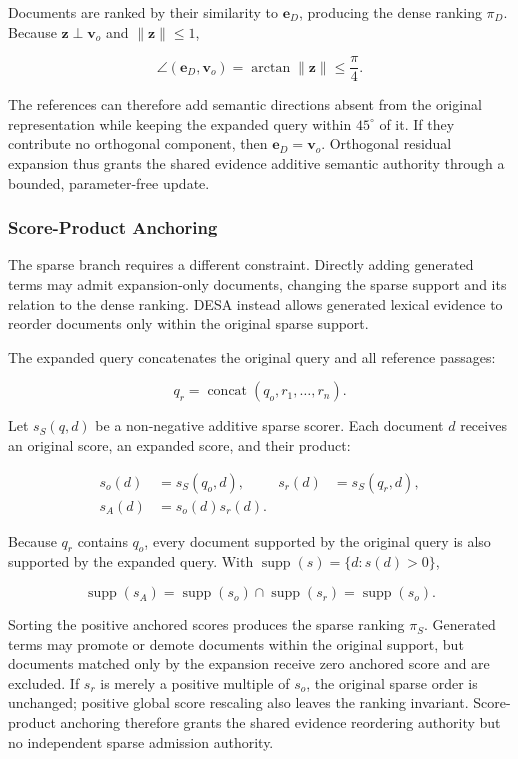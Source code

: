 Documents are ranked by their similarity to \(\mathbf e_D\), producing the dense ranking \(\pi_D\). Because \(\mathbf z\perp\mathbf v_o\) and \(\|\mathbf z\|\leq1\),

\[\angle(\mathbf e_D,\mathbf v_o)
=\arctan\|\mathbf z\|
\leq\frac{\pi}{4}.\]

The references can therefore add semantic directions absent from the original representation while keeping the expanded query within \(45^\circ\) of it. If they contribute no orthogonal component, then \(\mathbf e_D=\mathbf v_o\). Orthogonal residual expansion thus grants the shared evidence additive semantic authority through a bounded, parameter-free update.

\subsubsection{Score-Product Anchoring}

\label{score-product-anchoring}

The sparse branch requires a different constraint. Directly adding generated terms may admit expansion-only documents, changing the sparse support and its relation to the dense ranking. DESA instead allows generated lexical evidence to reorder documents only within the original sparse support.

The expanded query concatenates the original query and all reference passages:

\[q_r=\operatorname{concat}(q_o,r_1,\ldots,r_n).\]

Let \(s_S(q,d)\) be a non-negative additive sparse scorer. Each document \(d\) receives an original score, an expanded score, and their product:

\[\begin{aligned}
s_o(d)&=s_S(q_o,d), &
s_r(d)&=s_S(q_r,d),\\
s_A(d)&=s_o(d)s_r(d).&&
\end{aligned}\]

Because \(q_r\) contains \(q_o\), every document supported by the original query is also supported by the expanded query. With \(\operatorname{supp}(s)=\{d:s(d)>0\}\),

\[\operatorname{supp}(s_A)
=\operatorname{supp}(s_o)\cap\operatorname{supp}(s_r)
=\operatorname{supp}(s_o).\]

Sorting the positive anchored scores produces the sparse ranking \(\pi_S\). Generated terms may promote or demote documents within the original support, but documents matched only by the expansion receive zero anchored score and are excluded. If \(s_r\) is merely a positive multiple of \(s_o\), the original sparse order is unchanged; positive global score rescaling also leaves the ranking invariant. Score-product anchoring therefore grants the shared evidence reordering authority but no independent sparse admission authority.
